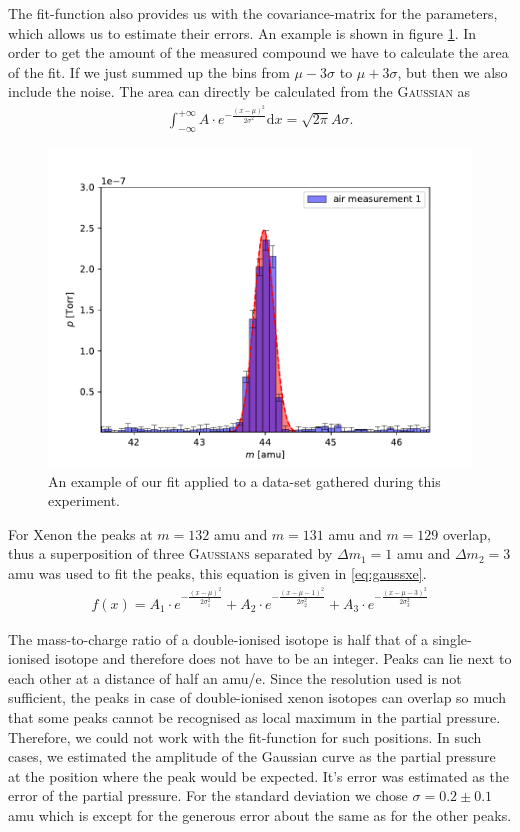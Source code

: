 The fit-function also provides us with the covariance-matrix for the parameters, which allows us to estimate their errors.  
An example is shown in figure \ref{fig:gauss_int}. In order to get the amount of the measured compound we have to calculate the area of the fit. If we just summed up the bins from $\mu-3\sigma$ to $\mu+3\sigma$, but then we also include the noise. The area can directly be calculated from the {\scshape Gaussian} as
\begin{align}
    \int_{-\infty}^{+\infty} A\cdot e^{-\frac{(x-\mu)^2}{2\sigma^2}} \mathrm{d}x = \sqrt{2\pi}A\sigma. \label{eq:gauss_int} 
\end{align}
\begin{figure}[h!]
    \centering
    \includegraphics[width=\textwidth]{Report/DataResultsPlots/peak.pdf}
    \caption{An example of our fit applied to a data-set gathered during this experiment.}
    \label{fig:gauss_int}
\end{figure}
For Xenon the peaks at $m=132$ amu and $m=131$ amu and $m=129$ overlap, thus a superposition of three {\scshape Gaussians} separated by $\Delta m_1 = 1$ amu and $\Delta m_2 = 3$ amu was used to fit the peaks, this equation is given in \eqref{eq:gaussxe}.
\begin{align}
    f(x) = A_1\cdot e^{-\frac{(x-\mu)^2}{2\sigma_1^2}} + A_2\cdot e^{-\frac{(x-\mu - 1)^2}{2\sigma_2^2}} + A_3\cdot e^{-\frac{(x-\mu-3)^2}{2\sigma_3^2}} \label{eq:gaussxe}
\end{align}

The mass-to-charge ratio of a double-ionised isotope is half that of a single-ionised isotope and therefore does not have to be an integer. Peaks can lie next to each other at a distance of half an amu/e.  Since the resolution used is not sufficient, the peaks in case of double-ionised xenon isotopes can overlap so much that some peaks cannot be recognised as local maximum in the partial pressure. Therefore, we could not work with the fit-function for such positions. In such cases, we estimated the amplitude of the Gaussian curve as the partial pressure at the position where the peak would be expected. It's error was estimated as the error of the partial pressure.  For the standard deviation we chose $\sigma = 0.2 \pm 0.1$ amu which is except for the generous error about the same as for the other peaks. 

